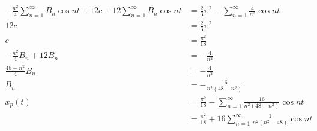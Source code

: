 \documentclass{article}
\begin{document}
\begin{align*}
  -\frac{n^2}{4} \sum_{n = 1}^\infty B_n \cos n t + 12 c + 12 \sum_{n = 1}^\infty B_n \cos n t & = \frac{2}{3} \pi^2 - \sum_{n = 1}^\infty \frac{4}{n^2} \cos n t              \\
  12 c                                                                                         & = \frac{2}{3} \pi^2                                                           \\
  c                                                                                            & = \frac{\pi^2}{18}                                                            \\
  -\frac{n^2}{4} B_n + 12 B_n                                                                  & = -\frac{4}{n^2}                                                              \\
  \frac{48 - n^2}{4} B_n                                                                       & = -\frac{4}{n^2}                                                              \\
  B_n                                                                                          & = -\frac{16}{n^2 (48 - n^2)}                                                  \\
  x_p(t)                                                                                       & = \frac{\pi^2}{18} - \sum_{n = 1}^\infty \frac{16}{n^2 (48 - n^2)} \cos n t   \\
                                                                                               & = \frac{\pi^2}{18} + 16 \sum_{n = 1}^\infty \frac{1}{n^2 (n^2 - 48)} \cos n t
\end{align*}
\end{document}
